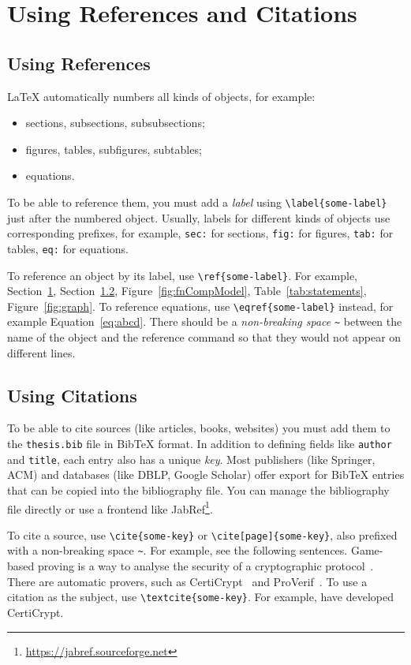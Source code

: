 \section{Using References and Citations}
\label{sec:refs-cites}

\subsection{Using References}
LaTeX automatically numbers all kinds of objects, for example:
\begin{itemize}
    \item sections, subsections, subsubsections;
    \item figures, tables, subfigures, subtables;
    \item equations.
\end{itemize}
To be able to reference them, you must add a \emph{label} using \verb|\label{some-label}| just after the numbered object.
Usually, labels for different kinds of objects use corresponding prefixes, for example, \verb|sec:| for sections, \verb|fig:| for figures, \verb|tab:| for tables, \verb|eq:| for equations.

To reference an object by its label, use \verb|\ref{some-label}|.
For example, Section~\ref{sec:refs-cites}, Section~\ref{sec:cites}, Figure~\ref{fig:fnCompModel}, Table~\ref{tab:statements}, Figure~\ref{fig:graph}.
To reference equations, use \verb|\eqref{some-label}| instead, for example Equation~\eqref{eq:abcd}.
There should be a \emph{non-breaking space} \verb|~| between the name of the object and the reference command so that they would not appear on different lines.


\subsection{Using Citations}
\label{sec:cites}

To be able to cite sources (like articles, books, websites) you must add them to the \verb|thesis.bib| file in BibTeX format.
In addition to defining fields like \verb|author| and \verb|title|, each entry also has a unique \emph{key}.
Most publishers (like Springer, ACM) and databases (like DBLP, Google Scholar) offer export for BibTeX entries that can be copied into the bibliography file.
You can manage the bibliography file directly or use a frontend like JabRef\footnote{\url{https://jabref.sourceforge.net}}.

To cite a source, use \verb|\cite{some-key}| or \verb|\cite[page]{some-key}|, also prefixed with a non-breaking space \verb|~|.
For example, see the following sentences.
Game-based proving is a way to analyse the security of a cryptographic protocol~\cite{GameB_1,GameB_2}.
There are automatic provers, such as CertiCrypt~\cite{certiCrypt} and ProVerif~\cite{proVerif}.
To use a citation as the subject, use \verb|\textcite{some-key}|.
For example, \textcite{certiCrypt} have developed CertiCrypt.

